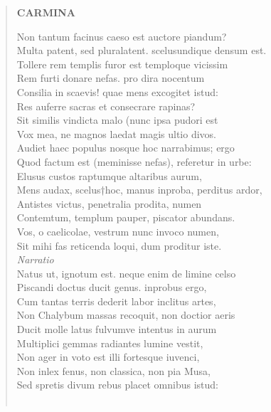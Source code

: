 \documentclass[11pt, a4paper]{report}
\begin{document}
\begin{verse}
    \begin{center} \textbf{CARMINA} \end{center} \marginpar{[86]} Non  \lbrack tantum \rbrack  facinus caeso est auctore piandum? \\ Multa patent, sed pluralatent. scelusundique densum est. \\ Tollere rem templis furor est temploque vicissim \\ Rem furti donare nefas. pro dira nocentum \\ Consilia in scaevis! quae mens excogitet istud: \\ Res auferre sacras et consecrare rapinas? \\ Sit similis vindicta malo (nunc ipsa pudori est \\ Vox mea, ne magnos laedat magis ultio divos. \\ Audiet haec populus nosque hoc narrabimus; ergo \\ Quod factum est (meminisse nefas), referetur in urbe: \\ Elusus custos raptumque altaribus aurum, \\ Mens audax, scelus†hoc, manus inproba, perditus ardor, \\ Antistes victus, penetralia prodita, numen \\ Contemtum, templum pauper, piscator abundans. \\ Vos, o caelicolae, vestrum nunc invoco numen, \\ Sit mihi fas reticenda loqui, dum proditur iste. \\ \textit{ \lbrack Narratio \rbrack } \\ Natus ut, ignotum est. neque enim de limine celso \\ Piscandi doctus ducit genus. inprobus ergo, \\ Cum tantas terris dederit labor inclitus artes, \\ Non Chalybum massas recoquit, non doctior aeris \\ Ducit molle latus fulvumve intentus in aurum \\ Multiplici gemmas radiantes lumine vestit, \\ Non ager in voto est illi fortesque iuvenci, \\ Non inlex fenus, non classica, non pia Musa, \\ Sed spretis divum rebus placet omnibus istud: \\ 
        ﻿\pagebreak 

\end{verse}
\end{document}
